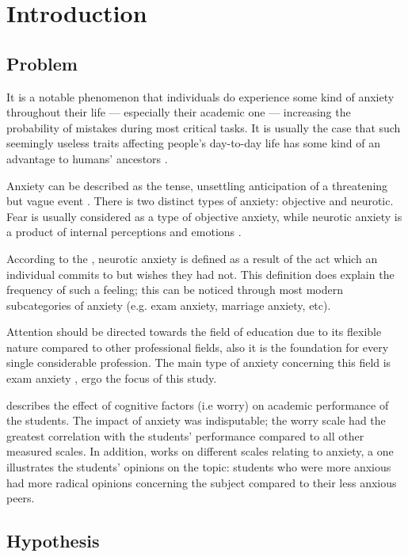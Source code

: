 \documentclass[12pt]{report}
\begin{document}
\chapter{Introduction}
\begin{multicols}{2}
\section{Problem}

It is a notable phenomenon that individuals do experience some kind of anxiety
throughout their life — especially their academic one — increasing the
probability of mistakes during most critical tasks. It is usually the case that
such seemingly useless traits affecting people's day-to-day life has some kind
of an advantage to humans' ancestors \parencite{Price2003-bl}. 

Anxiety can be described as the tense, unsettling anticipation of a threatening
but vague event \parencite{Rachman2019-cn}. There is two distinct types of
anxiety: objective and neurotic. Fear is usually considered as a type of
objective anxiety, while neurotic anxiety is a product of internal perceptions
and emotions \parencite{Spielberger1966-dk}. 

According to the \cite{mowrer1939stimulus}, neurotic anxiety is defined as a
result of the act which an individual commits to but wishes they had not. This
definition does explain the frequency of such a feeling; this can be noticed
through most modern subcategories of anxiety (e.g. exam anxiety, marriage
anxiety, etc).

Attention should be directed towards the field of education due to its flexible
nature compared to other professional fields, also it is the foundation for
every single considerable profession. The main type of anxiety concerning this
field is exam anxiety \parencite{academic-anxiety}, ergo the focus of this study.

\cite{rana_2010_the} describes the effect of cognitive factors (i.e worry) on
academic performance of the students. The impact of anxiety was indisputable;
the worry scale had the greatest correlation with the students' performance
compared to all other measured scales. In addition, \cite{trifoni2011does} works
on different scales relating to anxiety, a one illustrates the students'
opinions on the topic: students who were more anxious had more radical opinions
concerning the subject compared to their less anxious peers.

\section{Hypothesis}


\end{multicols}
\end{document}

